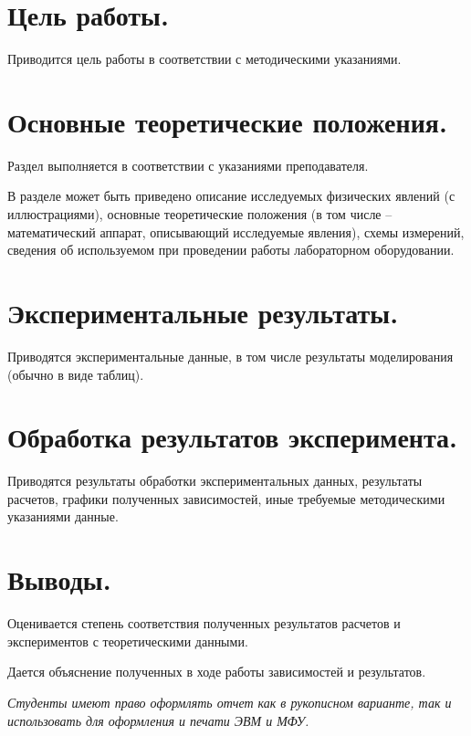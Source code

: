 \documentclass[14pt]{article}
\begin{document}
	
	\section{Цель работы.}
	Приводится цель работы в соответствии с методическими указаниями.

	\section{Основные теоретические положения.}
	Раздел выполняется в соответствии с указаниями преподавателя.
	
	В разделе может быть приведено описание исследуемых физических явлений (с иллюстрациями), основные теоретические положения (в том числе – математический аппарат, описывающий исследуемые явления), схемы измерений, сведения об используемом при проведении работы лабораторном оборудовании.
	
	\section{Экспериментальные результаты.}
	Приводятся экспериментальные данные, в том числе результаты моделирования (обычно в виде таблиц).
	
	\section{Обработка результатов эксперимента.}
	Приводятся результаты обработки экспериментальных данных, результаты расчетов, графики полученных зависимостей, иные требуемые методическими указаниями данные.
	
	\section{Выводы.}
	Оценивается степень соответствия полученных результатов расчетов и экспериментов с теоретическими данными. 
	
	Дается объяснение полученных в ходе работы зависимостей и результатов. \newline

	\textit{Студенты имеют право оформлять отчет как в рукописном варианте, так и использовать для оформления и печати ЭВМ и МФУ.	}
	
\end{document}
